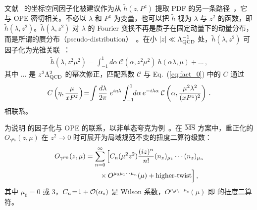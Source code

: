 文献~\cite{Braun:1994jq} 的坐标空间因子化被建议作为从 $\tilde h(z, P^z)$ 提取 PDF 的另一条路径~\cite{Radyushkin:2017cyf,Orginos:2017kos,Radyushkin:2019mye}，它与 OPE 密切相关。不必以 $\lambda$ 和 $P^z$ 为变量，也可以把 $\tilde h$ 视为 $\lambda$ 与 $z^2$ 的函数，即 $\tilde h(\lambda, z^2)$。$\tilde h(\lambda, z^2)$ 对 $\lambda$ 的 Fourier 变换不再是质子在固定动量下的动量分布，而是所谓的赝分布（pseudo-distribution）~\cite{Radyushkin:2017cyf}。在小 $|z|\ll \Lambda^{-1}_{\rm QCD}$ 处，$\tilde h(\lambda, z^2)$ 可因子化为光锥关联~\cite{Radyushkin:2017lvu,Izubuchi:2018srq}：
\begin{align}
	\label{eq:io-Q-fact}
	\tilde{h}(\lambda, z^2\mu^2)
	=\int_{-1}^1 d\alpha\ \mathcal{C}(\alpha, z^2\mu^2)\ h(\alpha\lambda,\mu) +...\,,
\end{align}
其中 $...$ 是 $z^2\Lambda^2_{\rm QCD}$ 的幂次修正，匹配系数 $\mathcal{C}$ 与 Eq.~(\ref{eq:fact_0}) 中的 $C$ 通过
\begin{align} \label{eq:ftc-C}
	C\left(\eta,{\mu\over xP^z}\right)
	\!= \!\int {d\lambda\over 2\pi}\ e^{i\eta\lambda}\int_{-1}^1\!\! d\alpha\: e^{-i\lambda\alpha}\: \mathcal{C}\left(\alpha,{\mu^2 \lambda^2\over (xP^z)^2}\right)\,.
\end{align}
相联系。

为说明  的因子化与 OPE 的联系，以非单态夸克为例~\cite{Izubuchi:2018srq,Wang:2019tgg}。在 ${\overline{\rm MS}}$ 方案中，重正化的 $O_{\gamma^{\mu_0}}(z,\mu)$ 在 $z^2\to 0$ 时可展开为局域规范不变的扭度二算符级数：
\begin{align}\label{eq:ope-tq}
	O_{\gamma^{\mu_0}}(z,\mu) &=\sum_{n=0}^\infty \Big[C_n ({\mu}^2 z^2)\frac{(iz)^n}{n!} (n_z)_{\mu_1}\cdots (n_z)_{\mu_n} \nonumber\\
	&\qquad \times O^{\mu_0\mu_1\cdots\mu_n}(\mu) +  \text{higher-twist}\Big]\,,
\end{align}
其中 $\mu_0\!=\!0$ 或 $3$，$C_n\!=\!1+{\cal O}(\alpha_s)$ 是 Wilson 系数，$O^{\mu_0\mu_1\cdots\mu_n}(\mu)$ 即  的扭度二算符。

